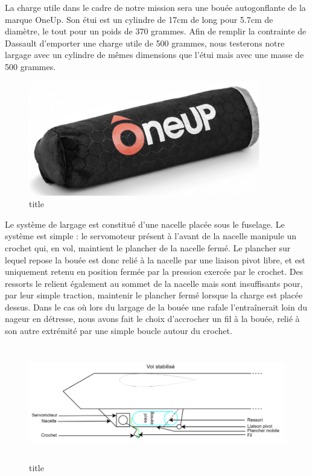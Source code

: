 \documentclass[a4paper,12pt,french]{report}
\begin{document}
La charge utile dans le cadre de notre mission sera une bouée autogonflante de la marque OneUp. Son étui est un cylindre de 17cm de long pour 5.7cm de diamètre, le tout pour un poids de 370 grammes. Afin de remplir la contrainte de Dassault d’emporter une charge utile de 500 grammes, nous testerons notre largage avec un cylindre de mêmes dimensions que l’étui mais avec une masse de 500 grammes.

\begin{figure}[h]
    \centering
    \includegraphics[height=5cm]{figures/bouee.png}
    \caption{title}
\end{figure}

Le système de largage est constitué d’une nacelle placée sous le fuselage. Le système est simple : le servomoteur présent à l’avant de la nacelle manipule un crochet qui, en vol, maintient le plancher de la nacelle fermé. Le plancher sur lequel repose la bouée est donc relié à la nacelle par une liaison pivot libre, et est uniquement retenu en position fermée par la pression exercée par le crochet. Des ressorts le relient également au sommet de la nacelle mais sont insuffisants pour, par leur simple traction, maintenir le plancher fermé lorsque la charge est placée dessus. Dans le cas où lors du largage de la bouée une rafale l’entraînerait loin du nageur en détresse, nous avons fait le choix d’accrocher un fil à la bouée, relié à son autre extrémité par une simple boucle autour du crochet.\newline

\begin{figure}[h]
    \centering
    \includegraphics[height=5cm]{figures/b1.png}
    \caption{title}
\end{figure}
\end{document}
